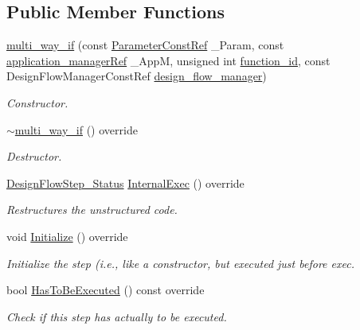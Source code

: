 \subsection*{Public Member Functions}
\begin{DoxyCompactItemize}
\item 
\hyperlink{classmulti__way__if_ae2ba8078520ffa6983a72c4d955c8314}{multi\+\_\+way\+\_\+if} (const \hyperlink{Parameter_8hpp_a37841774a6fcb479b597fdf8955eb4ea}{Parameter\+Const\+Ref} \+\_\+\+Param, const \hyperlink{application__manager_8hpp_a04ccad4e5ee401e8934306672082c180}{application\+\_\+manager\+Ref} \+\_\+\+AppM, unsigned int \hyperlink{classFunctionFrontendFlowStep_a58ef2383ad1a212a8d3f396625a4b616}{function\+\_\+id}, const Design\+Flow\+Manager\+Const\+Ref \hyperlink{classDesignFlowStep_ab770677ddf087613add30024e16a5554}{design\+\_\+flow\+\_\+manager})
\begin{DoxyCompactList}\small\item\em Constructor. \end{DoxyCompactList}\item 
\hyperlink{classmulti__way__if_aee90986a58430ee295582e404e5922ec}{$\sim$multi\+\_\+way\+\_\+if} () override
\begin{DoxyCompactList}\small\item\em Destructor. \end{DoxyCompactList}\item 
\hyperlink{design__flow__step_8hpp_afb1f0d73069c26076b8d31dbc8ebecdf}{Design\+Flow\+Step\+\_\+\+Status} \hyperlink{classmulti__way__if_a48bf37aef9a799c0d3b1322e27502a0f}{Internal\+Exec} () override
\begin{DoxyCompactList}\small\item\em Restructures the unstructured code. \end{DoxyCompactList}\item 
void \hyperlink{classmulti__way__if_a8503a9e02e909dfe59978ad170f2d844}{Initialize} () override
\begin{DoxyCompactList}\small\item\em Initialize the step (i.\+e., like a constructor, but executed just before exec. \end{DoxyCompactList}\item 
bool \hyperlink{classmulti__way__if_a067bd457b6d38a33de81d0a3b474f947}{Has\+To\+Be\+Executed} () const override
\begin{DoxyCompactList}\small\item\em Check if this step has actually to be executed. \end{DoxyCompactList}\end{DoxyCompactItemize}
